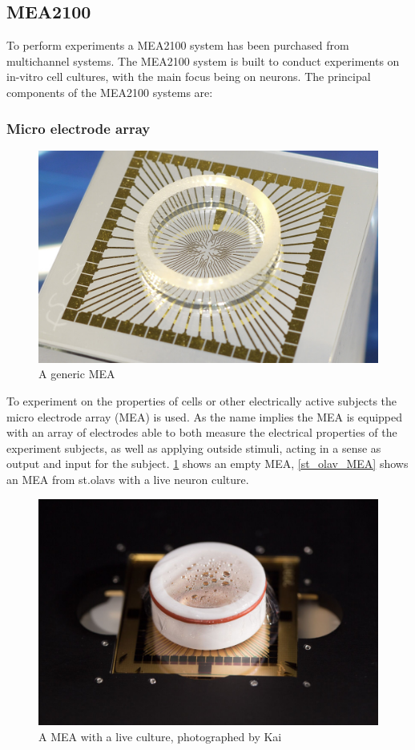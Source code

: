\subsection{MEA2100}
To perform experiments a MEA2100 system has been purchased from multichannel systems.
The MEA2100 system is built to conduct experiments on in-vitro cell cultures, 
with the main focus being on neurons.
The principal components of the MEA2100 systems are:
\subsubsection{Micro electrode array}
\begin{figure}[h!]
    \includegraphics[width=\linewidth]{images/MEA.jpg}
    \caption{A generic MEA}
    \label{fig:generic_MEA}
\end{figure}
To experiment on the properties of cells or other electrically active subjects the
micro electrode array (MEA) is used. As the name implies the MEA is equipped with
an array of electrodes able to both measure the electrical properties of the 
experiment subjects, as well as applying outside stimuli, acting in a sense as
output and input for the subject. \ref{fig:generic_MEA} shows an empty MEA,
\ref{st_olav_MEA} shows an MEA from st.olavs with a live neuron culture.
\begin{figure}[h!]
    \includegraphics[width=\linewidth]{images/st-olavs-mea.jpg}
    \caption{A MEA with a live culture, photographed by Kai}
    \label{fig:st_olav_MEA}
\end{figure}
